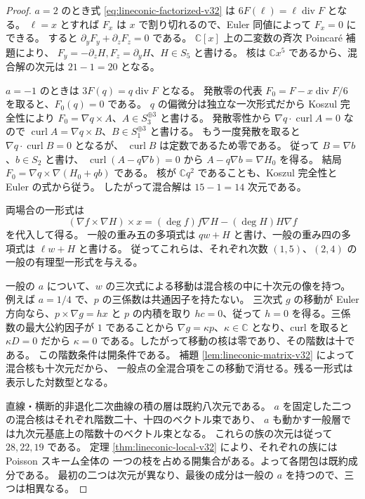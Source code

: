 \begin{proof}
$a=2$ のとき式 \eqref{eq:lineconic-factorized-v32} は
$6F(\ell)=\ell\operatorname{div}F$ となる。
$\ell=x$ とすれば $F_x$ は $x$ で割り切れるので、Euler 同値によって $F_x=0$ にできる。
すると $\partial_yF_y+\partial_zF_z=0$ である。
$\mathbb C[x]$ 上の二変数の斉次 Poincar\'e 補題により、
$F_y=-\partial_zH,F_z=\partial_yH$、$H\in S_5$ と書ける。
核は $\mathbb Cx^5$ であるから、混合解の次元は $21-1=20$ となる。

$a=-1$ のときは $3F(q)=q\operatorname{div}F$ となる。
発散零の代表 $F_0=F-x\operatorname{div}F/6$ を取ると、$F_0(q)=0$ である。
$q$ の偏微分は独立な一次形式だから Koszul 完全性により
$F_0=\nabla q\times A$、$A\in S_3^{\oplus3}$ と書ける。
発散零性から $\nabla q\cdot\operatorname{curl}A=0$ なので
$\operatorname{curl}A=\nabla q\times B$、$B\in S_1^{\oplus3}$ と書ける。
もう一度発散を取ると $\nabla q\cdot\operatorname{curl}B=0$ となるが、
$\operatorname{curl}B$ は定数であるため零である。
従って $B=\nabla b$、$b\in S_2$ と書け、
$\operatorname{curl}(A-q\nabla b)=0$ から $A-q\nabla b=\nabla H_0$ を得る。
結局 $F_0=\nabla q\times\nabla(H_0+qb)$ である。
核が $\mathbb Cq^2$ であることも、Koszul 完全性と Euler の式から従う。
したがって混合解は $15-1=14$ 次元である。

両場合の一形式は
\[
 (\nabla f\times\nabla H)\times x
 =(\deg f)f\nabla H-(\deg H)H\nabla f
\]
を代入して得る。
一般の重み五の多項式は $qw+H$ と書け、一般の重み四の多項式は $\ell w+H$ と書ける。
従ってこれらは、それぞれ次数 $(1,5)$、$(2,4)$ の一般の有理型一形式を与える。

一般の $a$ について、$w$ の三次式による移動は混合核の中に十次元の像を持つ。
例えば $a=1/4$ で、$p$ の三係数は共通因子を持たない。
三次式 $g$ の移動が Euler 方向なら、$p\times\nabla g=hx$ と $p$ の内積を取り
$hc=0$、従って $h=0$ を得る。三係数の最大公約因子が $1$ であることから
$\nabla g=\kappa p$、$\kappa\in\mathbb C$ となり、curl を取ると
$\kappa D=0$ だから $\kappa=0$ である。したがって移動の核は零であり、その階数は十である。
この階数条件は開条件である。
補題 \ref{lem:lineconic-matrix-v32} によって混合核も十次元だから、
一般点の全混合項をこの移動で消せる。残る一形式は表示した対数型となる。

直線・横断的非退化二次曲線の積の層は既約八次元である。
$a$ を固定した二つの混合核はそれぞれ階数二十、十四のベクトル束であり、
$a$ も動かす一般層では九次元基底上の階数十のベクトル束となる。
これらの族の次元は従って $28,22,19$ である。
定理 \ref{thm:lineconic-local-v32} により、それぞれの族には Poisson スキーム全体の
一つの枝を占める開集合がある。よって各閉包は既約成分である。
最初の二つは次元が異なり、最後の成分は一般の $a$ を持つので、三つは相異なる。
\end{proof}

